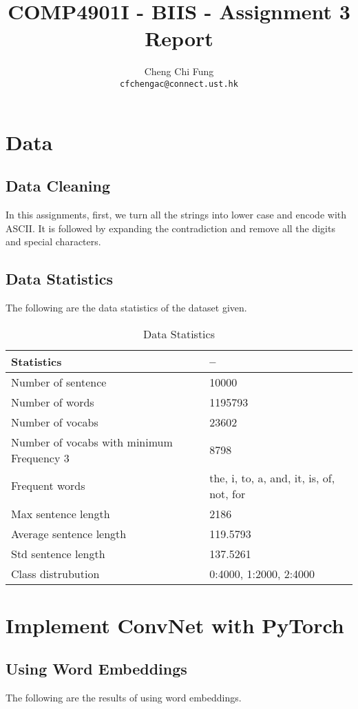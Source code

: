 \documentclass{article}
\title{COMP4901I - BIIS - Assignment 3 Report}
\author{%
	Cheng Chi Fung \\
	\texttt{cfchengac@connect.ust.hk} \\
}
\begin{document}
\maketitle

\section{Data}

\subsection{Data Cleaning}
In this assignments, first, we turn all the strings into lower case and encode with ASCII. It is followed by expanding the contradiction and remove all the digits and special characters.

\subsection{Data Statistics}
The following are the data statistics of the dataset given.

\begin{table}[htb]
	\caption{Data Statistics}
	\label{sample-table}
	\centering
	\begin{tabular}{ll}
		\toprule
		\cmidrule{1-2}
		Statistics & --  \\
		\midrule
		Number of sentence & 10000 \\
		Number of words & 1195793  \\
		Number of vocabs & 23602 \\
		Number of vocabs with minimum Frequency 3 & 8798 \\
		Frequent words & the, i, to, a, and, it,  is, of, not, for \\
		Max sentence length & 2186  \\
		Average sentence length & 119.5793  \\
		Std sentence length & 137.5261 \\
		Class distrubution & {0:4000, 1:2000, 2:4000} \\
		\bottomrule
	\end{tabular}
\end{table}

\section{Implement ConvNet with PyTorch}

\subsection{Using Word Embeddings}
The following are the results of using word embeddings.
\end{document}
